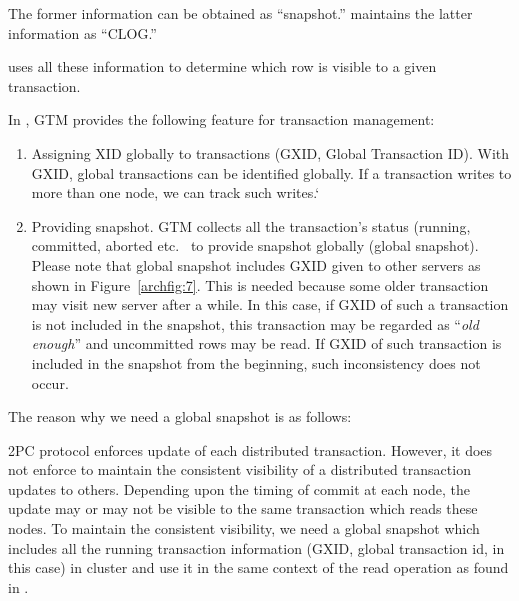   The former information can be obtained as ``snapshot.''
  \PG{}  maintains the latter information as ``CLOG.''
  
  \PG{} uses all these information to determine which row is visible to a given transaction.




  In \XC, GTM provides the following feature for transaction management:
  
  \begin{enumerate}
  
	  \item Assigning XID globally to transactions (GXID, Global Transaction ID).
	  		With GXID, global transactions can be identified globally.
			If a transaction writes to more than one node, we can track such writes.`
  
	  \item Providing snapshot. GTM collects all the transaction's status
	  		(running, committed, aborted etc.~ to provide snapshot globally (global snapshot).
  			Please note that global snapshot includes GXID given to other servers as
			shown in Figure~\ref{archfig:7}.
  			This is needed because some older transaction may visit new server after a while.
  			In this case, if GXID of such a transaction is not included in the snapshot,
  			this transaction may be regarded as ``{\it old enough}'' and uncommitted
			rows may be read.
  			If GXID of such transaction is included in the snapshot from the beginning,
			such inconsistency does not occur.
  
  \end{enumerate}
  
  The reason why we need a global snapshot is as follows:
  
  2PC protocol enforces update of each distributed transaction.
  However, it does not enforce to maintain the consistent visibility of a distributed transaction
  updates to others.
  Depending upon the timing of commit at each node, the update may or may not be visible to
  the same transaction which reads these nodes.
  To maintain the consistent visibility, we need a global snapshot
  which includes all the running transaction information (GXID, global transaction id, in this case)
  in \XC{} cluster and use it in the same context of the read operation as found in \PG.
  
